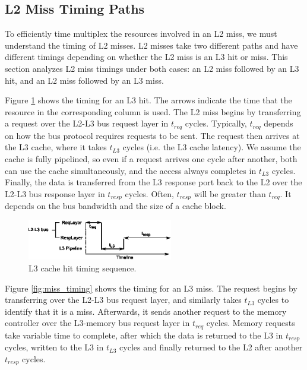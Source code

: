 \subsection{L2 Miss Timing Paths}
To efficiently time multiplex the resources involved in an L2 miss, 
we must understand the timing of L2 misses. L2 misses take two different 
paths and have different timings depending on whether the L2 miss is an L3 hit 
or miss. This section analyzes L2 miss timings under both cases: an L2 miss
followed by an L3 hit, and an L2 miss followed by an L3 miss.

Figure \ref{fig:hit_timing} shows the timing for an L3 hit. The arrows 
indicate the time that the resource in the corresponding column is used.
The L2 miss begins by transferring a request over the L2-L3 bus request layer 
in $t_{req}$ cycles. Typically, $t_{req}$ depends on how the bus protocol 
requires requests to be sent. The request then arrives at the L3 cache, where 
it takes $t_{L3}$ cycles (i.e. the L3 cache latency). We assume the cache is 
fully pipelined, so even if a request arrives one cycle after another, both can 
use the cache simultaneously, and the access always completes in $t_{L3}$ 
cycles. Finally, the data is transferred from the L3 response port back to the 
L2 over the L2-L3 bus response layer in $t_{resp}$ cycles. Often, $t_{resp}$ 
will be greater than $t_{req}$. It depends on the bus bandwidth and the size of 
a cache block.

\begin{figure}
    \begin{center}
        \includegraphics[width=2.5in]{figs/hit_timing.eps}
        \caption{L3 cache hit timing sequence.}
        \label{fig:hit_timing}
    \end{center}
\end{figure}

Figure \ref{fig:miss_timing} shows the timing for an L3 miss. The request 
begins by transferring over the L2-L3 bus request layer, and similarly takes 
$t_{L3}$ cycles to identify that it is a miss. Afterwards, it sends another 
request to the memory controller over the L3-memory bus request layer in 
$t_{req}$ cycles. Memory requests take variable time to complete, after which 
the data is returned to the L3 in $t_{resp}$ cycles, written to the L3 in 
$t_{L3}$ cycles and finally returned to the L2 after another $t_{resp}$ cycles.

